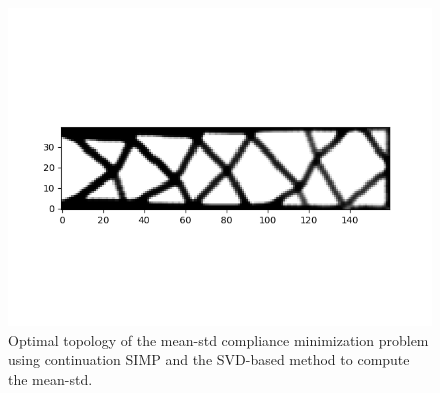       \begin{figure}
        \centering
        \includegraphics[width=\textwidth]{./images/robust_exact/exact_svd_mean_std_csimp.png}
        \caption{Optimal topology of the mean-std compliance minimization problem using continuation SIMP and the SVD-based method to compute the mean-std.}
        \label{fig:mean_std}
      \end{figure}

